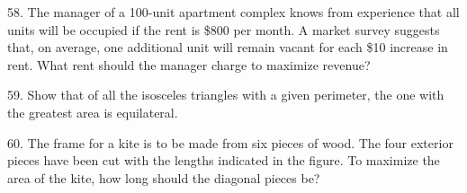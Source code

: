 \documentclass{sebase}
\begin{document}
\begin{multicols}{2}
\begin{ExerciseList}
\begin{ExerciseList}
%
\end{ExerciseList}

\item[\hfill 58.] The manager of a 100-unit apartment complex knows from
experience that all units will be occupied if the rent is \$800 per month. A
market survey suggests that, on average, one additional unit will remain
vacant for each \$10 increase in rent. What rent should the manager charge
to maximize revenue?

%

\item[\hfill 59.] Show that of all the isosceles triangles with a given
perimeter, the one with the greatest area is equilateral.

%

%

\item[\hfill 60.] 
\CASX%
The frame for a kite is to be made from six pieces of wood. The four
exterior pieces have been cut with the lengths indicated in the figure. To
maximize the area of the kite, how long should the diagonal pieces be?\\[6pt]
\hspace*{\fill}\hspace*{\fill}

%


\end{ExerciseList}
\end{multicols}
\end{document}
